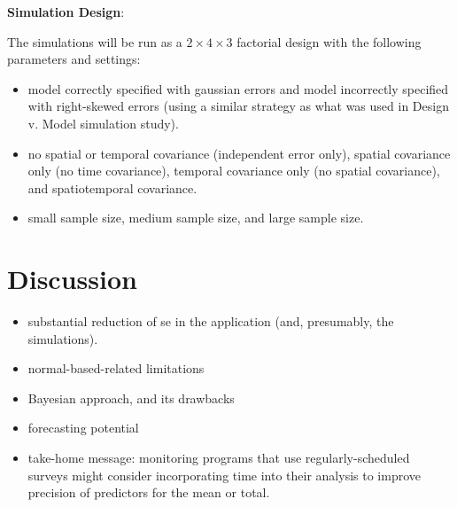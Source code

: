 \documentclass[]{interact}
\theoremstyle{plain}%
\theoremstyle{definition}
\theoremstyle{remark}
\providecommand{\tightlist}{%
  \setlength{\itemsep}{0pt}\setlength{\parskip}{0pt}}
\def\tightlist{}
\begin{document}
\textbf{Simulation Design}:

The simulations will be run as a \(2 \times 4 \times 3\) factorial
design with the following parameters and settings:

\begin{itemize}
\tightlist
\item
  model correctly specified with gaussian errors and model incorrectly
  specified with right-skewed errors (using a similar strategy as what
  was used in Design v. Model simulation study).
\item
  no spatial or temporal covariance (independent error only), spatial
  covariance only (no time covariance), temporal covariance only (no
  spatial covariance), and spatiotemporal covariance.
\item
  small sample size, medium sample size, and large sample size.
\end{itemize}

\section{Discussion} \label{section:Discussion}

\begin{itemize}
\item
  substantial reduction of se in the application (and, presumably, the
  simulations).
\item
  normal-based-related limitations
\item
  Bayesian approach, and its drawbacks
\item
  forecasting potential
\item
  take-home message: monitoring programs that use regularly-scheduled
  surveys might consider incorporating time into their analysis to
  improve precision of predictors for the mean or total.
\end{itemize}



\end{document}

